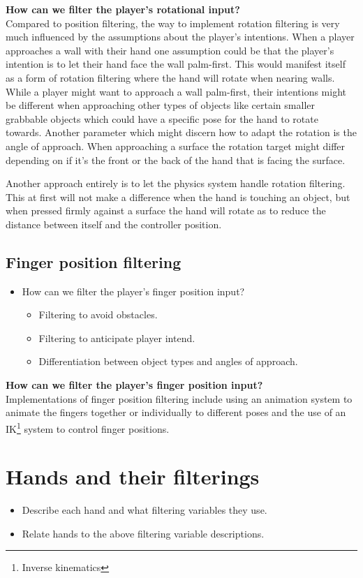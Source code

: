 \textbf{How can we filter the player's rotational input?}\\
Compared to position filtering, the way to implement rotation filtering is very much influenced by the assumptions about the player's intentions. When a player approaches a wall with their hand one assumption could be that the player's intention is to let their hand face the wall palm-first. This would manifest itself as a form of rotation filtering where the hand will rotate when nearing walls. While a player might want to approach a wall palm-first, their intentions might be different when approaching other types of objects like certain smaller grabbable objects which could have a specific pose for the hand to rotate towards. Another parameter which might discern how to adapt the rotation is the angle of approach. When approaching a surface the rotation target might differ depending on if it's the front or the back of the hand that is facing the surface.

Another approach entirely is to let the physics system handle rotation filtering. This at first will not make a difference when the hand is touching an object, but when pressed firmly against a surface the hand will rotate as to reduce the distance between itself and the controller position.

\subsection{Finger position filtering}
\label{subsec:implementationFingerFiltering}
\begin{itemize}
\item How can we filter the player's finger position input?
\begin{itemize}
\item Filtering to avoid obstacles.
\item Filtering to anticipate player intend.
\item Differentiation between object types and angles of approach.
\end{itemize}
\end{itemize}

\textbf{How can we filter the player's finger position input?}\\
Implementations of finger position filtering include using an animation system to animate the fingers together or individually to different poses and the use of an IK\footnote{Inverse kinematics} system to control finger positions.

\section{Hands and their filterings}
\label{sec:LABELABOUTHANDSVERSIONS}
\begin{itemize}
\item Describe each hand and what filtering variables they use.
\item Relate hands to the above filtering variable descriptions.
\end{itemize}

